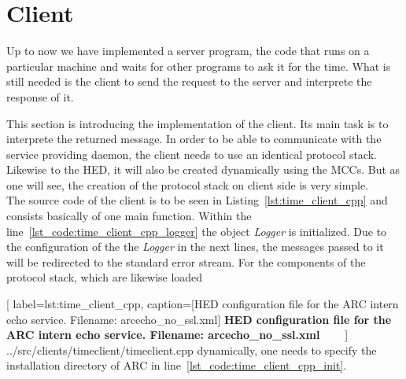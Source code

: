 \section{Client}\label{sec:timeservice_client}

Up to now we have implemented a server program, the code that runs on a particular machine and waits for other programs to ask it for the time. What is still needed is the client to send the request to the server and interprete the response of it.

This section is introducing the implementation of the client.
Its main task is to interprete the returned message.
In order to be able to communicate with the service providing daemon, the client needs to use an identical protocol stack.
Likewise to the HED, it will also be created dynamically using the MCCs.
But as one will see, the creation of the protocol stack on client side is very simple.\\

The source code of the client is to be seen in Listing~\ref{lst:time_client_cpp} and consists basically of one main function.
Within the line~\ref{lst_code:time_client_cpp_logger} the object \textit{Logger} is initialized.
Due to the configuration of the the \textit{Logger} in the next lines, the messages passed to it will be redirected to the standard error stream.  For the components of the protocol stack, which  are likewise loaded

	[
	label=lst:time_client_cpp,
	caption={[HED configuration file for the ARC intern echo service. Filename: arcecho\_no\_ssl.xml]
	\textbf{HED configuration file for the ARC intern echo service. Filename: arcecho\_no\_ssl.xml\textcolor{white}{hmf}}}
	]
{../src/clients/timeclient/timeclient.cpp}
 dynamically, one needs to specify the installation directory of ARC in line~\ref{lst_code:time_client_cpp_init}.

